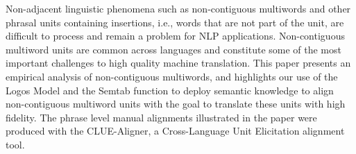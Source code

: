 Non-adjacent linguistic phenomena such as non-contiguous multiwords and other phrasal units containing insertions, i.e., words that are not part of the unit, are difficult to process and remain a problem for NLP applications. Non-contiguous multiword units are common across languages and constitute some of the most important challenges to high quality machine translation. This paper presents an empirical analysis of non-contiguous multiwords, and highlights our use of the Logos Model and the Semtab function to deploy semantic knowledge to align non-contiguous multiword units with the goal to translate these units with high fidelity. The phrase level manual alignments illustrated in the paper were produced with the CLUE-Aligner, a Cross-Language Unit Elicitation alignment tool.
